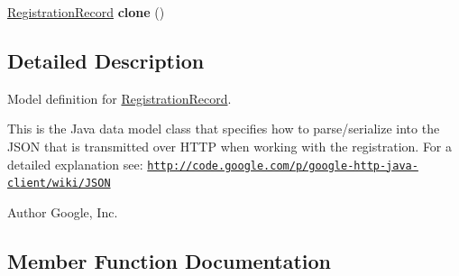 \begin{DoxyCompactItemize}
\item 
\hypertarget{classcom_1_1example_1_1lusifer_1_1myapplication_1_1backend_1_1registration_1_1model_1_1_registration_record_a3d1c9a0cdba0b343c8541865c8540ed5}{}\hyperlink{classcom_1_1example_1_1lusifer_1_1myapplication_1_1backend_1_1registration_1_1model_1_1_registration_record}{Registration\+Record} {\bfseries clone} ()\label{classcom_1_1example_1_1lusifer_1_1myapplication_1_1backend_1_1registration_1_1model_1_1_registration_record_a3d1c9a0cdba0b343c8541865c8540ed5}

\end{DoxyCompactItemize}


\subsection{Detailed Description}
Model definition for \hyperlink{classcom_1_1example_1_1lusifer_1_1myapplication_1_1backend_1_1registration_1_1model_1_1_registration_record}{Registration\+Record}.

This is the Java data model class that specifies how to parse/serialize into the J\+S\+O\+N that is transmitted over H\+T\+T\+P when working with the registration. For a detailed explanation see\+: \href{http://code.google.com/p/google-http-java-client/wiki/JSON}{\tt http\+://code.\+google.\+com/p/google-\/http-\/java-\/client/wiki/\+J\+S\+O\+N} 

\begin{DoxyAuthor}{Author}
Google, Inc. 
\end{DoxyAuthor}


\subsection{Member Function Documentation}
\hypertarget{classcom_1_1example_1_1lusifer_1_1myapplication_1_1backend_1_1registration_1_1model_1_1_registration_record_a1c1d099da55bc6115ff5304d2e51f38d}{}
